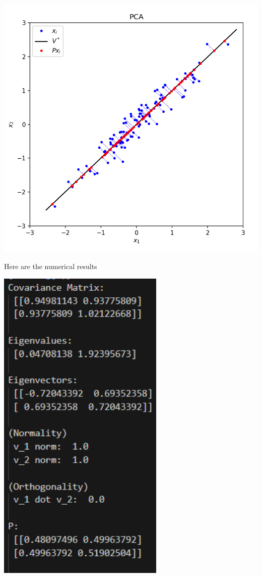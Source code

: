 \documentclass[11pt,letterpaper, leqno]{article}
\numberwithin{equation}{section}
\numberwithin{theorem}{section}
\numberwithin{lemma}{section}
\numberwithin{corollary}{section}
\numberwithin{definition}{section}
\numberwithin{proposition}{section}
\numberwithin{remark}{section}
\numberwithin{example}{section}
\begin{document}
        \begin{center}
            \includegraphics[width=\textwidth]{PCA.png}
        \end{center}

        Here are the numerical results 

        \begin{center}
            \includegraphics[width=0.6\textwidth]{Numeric results.png}
        \end{center}
\end{document}
